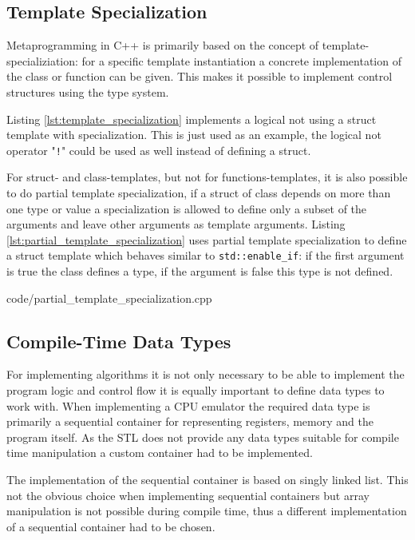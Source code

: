 \subsection{Template Specialization}
Metaprogramming in C++ is primarily based on the concept of template-specializiation: for a specific template instantiation
a concrete implementation of the class or function can be given. This makes it possible to implement control structures
using the type system. 

Listing \ref{lst:template_specialization} implements a logical not using a struct template with specialization. 
This is just used as an example, the logical not operator "\lstinline{!}" could be used as well instead of defining a struct.



For struct- and class-templates, but not for functions-templates, it is also possible to do partial template 
specialization, if a struct of class depends on more than one type or value a specialization is allowed to define
only a subset of the arguments and leave other arguments as template arguments. Listing
\ref{lst:partial_template_specialization} uses partial template specialization to define a struct template which
behaves similar to \lstinline{std::enable_if}: if the first argument is true the class defines a type, if the
argument is false this type is not defined.


    {code/partial_template_specialization.cpp}

\subsection{Compile-Time Data Types}
For implementing algorithms it is not only necessary to be able to implement the program logic and control flow
it is equally important to define data types to work with. When implementing a CPU emulator the required data type
is primarily a sequential container for representing registers, memory and the program itself. 
As the STL does not provide any data types suitable for compile time manipulation a custom container had to be implemented.

The implementation of the sequential container is based on singly linked list. 
This not the obvious choice when implementing sequential containers but array manipulation is not possible during 
compile time, thus a different implementation of a sequential container had to be chosen.

